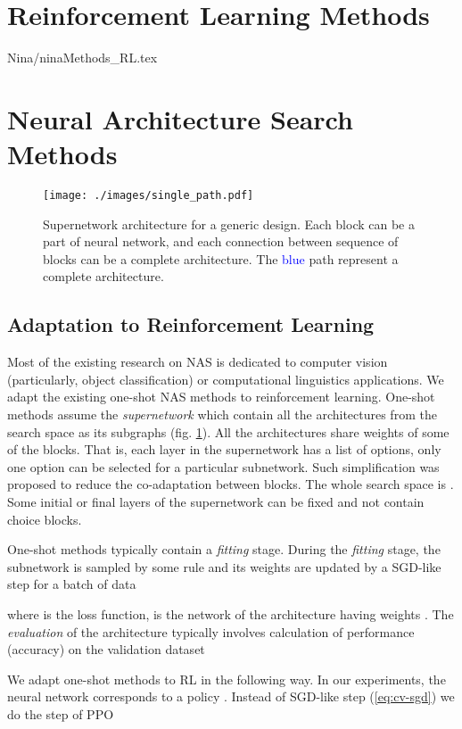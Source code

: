 \documentclass{svproc}
\begin{document}
\section{Reinforcement Learning Methods}
{Nina/ninaMethods_RL.tex}

\section{Neural Architecture Search Methods}

\begin{figure}
 \centering 
 \texttt{[image: ./images/single\_path.pdf]}
  \caption{Supernetwork architecture for a generic design. Each block can be a part of neural network, and each connection between sequence of blocks can be a complete architecture. The \textcolor{blue}{blue} path represent a complete architecture.
  }
  \label{fig:supernet_single}
\end{figure}

\subsection{Adaptation to Reinforcement Learning}
\label{sec:adapation}
Most of the existing research on NAS is dedicated to computer vision (particularly, object classification) or computational linguistics applications. We adapt the existing one-shot NAS methods to reinforcement learning. One-shot methods assume the \textit{supernetwork} which contain all the architectures from the search space as its subgraphs (fig. \ref{fig:supernet_single}). All the architectures share weights of some of the blocks. 
That is, each layer in the supernetwork  has a list of  options, only one option can be selected for a particular subnetwork. Such simplification was proposed to reduce the co-adaptation between blocks. The whole search space is . Some initial or final layers of the supernetwork can be fixed and not contain choice blocks.

One-shot methods typically contain a \textit{fitting} stage. During the \textit{fitting} stage, the subnetwork  is sampled by some rule and its weights  are updated by a SGD-like step for a batch of data 

where  is the loss function,  is the network of the architecture  having weights .
The \textit{evaluation} of the architecture  typically involves calculation of performance (accuracy) on the validation dataset 

We adapt one-shot methods to RL in the following way. In our experiments, the neural network  corresponds to a policy . Instead of SGD-like step (\ref{eq:cv-sgd}) we do the step of PPO 
\end{document}
